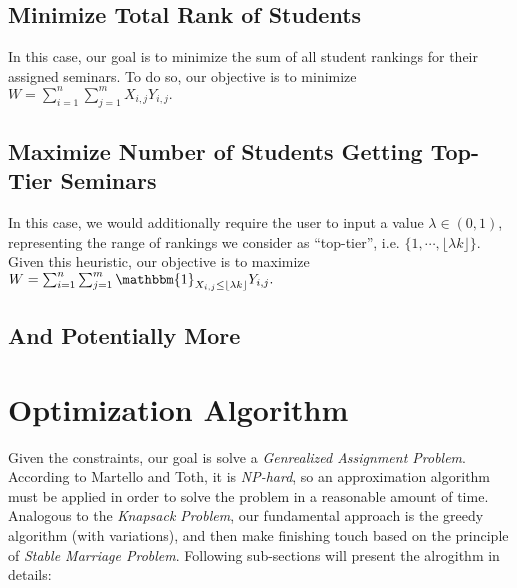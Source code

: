 \documentclass{article} %
\begin{document}
\subsection{Minimize Total Rank of Students}
    \par\qquad In this case, our goal is to minimize the sum of all student rankings for their assigned seminars. To do so, our objective is to minimize $W = \sum_{i=1}^{n}{\sum_{j=1}^{m}{X_{i,j}Y_{i,j}}}.$
\subsection{Maximize Number of Students Getting Top-Tier Seminars}
    \par\qquad In this case, we would additionally require the user to input a value $\lambda\in(0,1)$, representing the range of rankings we consider as ``top-tier'', i.e. $\{1,\cdots,\lfloor \lambda k\rfloor\}$. Given this heuristic, our objective is to maximize $W = \sum_{i=1}^{n}{\sum_{j=1}^{m}{\mathbbm{1}_{X_{i,j} \leq \lfloor \lambda k\rfloor}Y_{i,j}}}.$

\subsection{And Potentially More}

%
%
\section{Optimization Algorithm}
    \par\qquad Given the constraints, our goal is solve a \emph{Genrealized Assignment Problem}. According to Martello and Toth\cite{mt90}, it is \emph{NP-hard}, so an approximation algorithm must be applied in order to solve the problem in a reasonable amount of time. Analogous to the \emph{Knapsack Problem}, our fundamental approach is the greedy algorithm (with variations), and then make finishing touch based on the principle of \emph{Stable Marriage Problem}. Following sub-sections will present the alrogithm in details:
\end{document}
